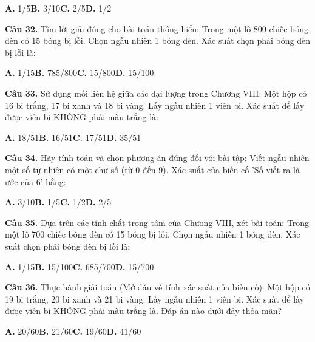 \documentclass[11pt,a4paper]{article}
\begin{document}
\hspace*{1.5em}\textbf{A.} 1/5\quad\quad \textbf{B.} 3/10\quad\quad \textbf{C.} 2/5\quad\quad \textbf{D.} 1/2\par\vspace{2pt}
\textbf{\color{primary} Câu 32.} Tìm lời giải đúng cho bài toán thông hiểu: Trong một lô 800 chiếc bóng đèn có 15 bóng bị lỗi. Chọn ngẫu nhiên 1 bóng đèn. Xác suất chọn phải bóng đèn bị lỗi là:\par
\hspace*{1.5em}\textbf{A.} 1/15\quad\quad \textbf{B.} 785/800\quad\quad \textbf{C.} 15/800\quad\quad \textbf{D.} 15/100\par\vspace{2pt}
\textbf{\color{primary} Câu 33.} Sử dụng mối liên hệ giữa các đại lượng trong Chương VIII: Một hộp có 16 bi trắng, 17 bi xanh và 18 bi vàng. Lấy ngẫu nhiên 1 viên bi. Xác suất để lấy được viên bi KHÔNG phải màu trắng là:\par
\hspace*{1.5em}\textbf{A.} 18/51\quad\quad \textbf{B.} 16/51\quad\quad \textbf{C.} 17/51\quad\quad \textbf{D.} 35/51\par\vspace{2pt}
\textbf{\color{primary} Câu 34.} Hãy tính toán và chọn phương án đúng đối với bài tập: Viết ngẫu nhiên một số tự nhiên có một chữ số (từ 0 đến 9). Xác suất của biến cố 'Số viết ra là ước của 6' bằng:\par
\hspace*{1.5em}\textbf{A.} 3/10\quad\quad \textbf{B.} 1/5\quad\quad \textbf{C.} 1/2\quad\quad \textbf{D.} 2/5\par\vspace{2pt}
\textbf{\color{primary} Câu 35.} Dựa trên các tính chất trọng tâm của Chương VIII, xét bài toán: Trong một lô 700 chiếc bóng đèn có 15 bóng bị lỗi. Chọn ngẫu nhiên 1 bóng đèn. Xác suất chọn phải bóng đèn bị lỗi là:\par
\hspace*{1.5em}\textbf{A.} 1/15\quad\quad \textbf{B.} 15/100\quad\quad \textbf{C.} 685/700\quad\quad \textbf{D.} 15/700\par\vspace{2pt}
\textbf{\color{primary} Câu 36.} Thực hành giải toán (Mở đầu về tính xác suất của biến cố): Một hộp có 19 bi trắng, 20 bi xanh và 21 bi vàng. Lấy ngẫu nhiên 1 viên bi. Xác suất để lấy được viên bi KHÔNG phải màu trắng là. Đáp án nào dưới đây thỏa mãn?\par
\hspace*{1.5em}\textbf{A.} 20/60\quad\quad \textbf{B.} 21/60\quad\quad \textbf{C.} 19/60\quad\quad \textbf{D.} 41/60\par\vspace{2pt}
\end{document}
